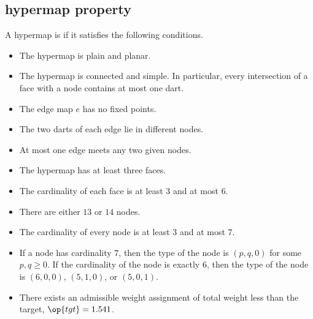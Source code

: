 \subsection{hypermap property}
\label{sec:graphproperty}

A hypermap is  if it satisfies the following conditions.
%
%

\begin{itemize}
\label{definition:tame}
\item {}  The hypermap is plain and planar.
\item {} The hypermap is connected and simple.  In
  particular, every intersection of a face with a node contains at
  most one dart.
\item {} The edge map $e$ has no fixed points.
\item {} The two darts of each edge lie in different nodes.
\item {} At most one edge meets any two given nodes.
%
\item {} The hypermap has at least three faces.
\item {} The cardinality of each face is at least $3$
  and at most $6$.
\item {} There are either $13$ or $14$ nodes.
\item {} The cardinality of every node is at least $3$
  and at most $7$.
\item {} If a node has cardinality $7$, then the type
  of the node is $(p,q,0)$ for some $p,q\ge0$.  If the cardinality of
  the node is exactly $6$, then the type of the node is $(6,0,0)$,
  $(5,1,0)$, or $(5,0,1)$.
\item {} There exists an admissible weight assignment
of total weight less than the target, $\op{tgt}=1.541$.
\end{itemize}
%
%
%
%
%
%
%
%

